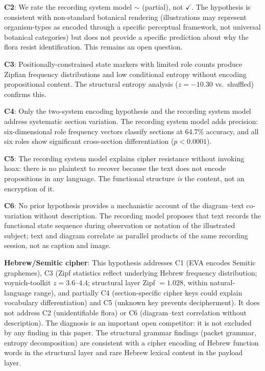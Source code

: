 \documentclass[11pt,a4paper,twocolumn]{article}
\begin{document}
\textbf{C2}: We rate the recording system model $\sim$ (partial), not $\checkmark$. The hypothesis is consistent with non-standard botanical rendering (illustrations may represent organism-types as encoded through a specific perceptual framework, not universal botanical categories) but does not provide a specific prediction about why the flora resist identification. This remains an open question.

\textbf{C3}: Positionally-constrained state markers with limited role counts produce Zipfian frequency distributions and low conditional entropy without encoding propositional content. The structural entropy analysis ($z = -10.30$ vs.\ shuffled) confirms this.

\textbf{C4}: Only the two-system encoding hypothesis and the recording system model address systematic section variation. The recording system model adds precision: six-dimensional role frequency vectors classify sections at 64.7\% accuracy, and all six roles show significant cross-section differentiation ($p < 0.0001$).

\textbf{C5}: The recording system model explains cipher resistance without invoking hoax: there is no plaintext to recover because the text does not encode propositions in any language. The functional structure \textit{is} the content, not an encryption of it.

\textbf{C6}: No prior hypothesis provides a mechanistic account of the diagram--text co-variation without description. The recording model proposes that text records the functional state sequence during observation or notation of the illustrated subject; text and diagram correlate as parallel products of the same recording session, not as caption and image.

\textbf{Hebrew/Semitic cipher}: This hypothesis addresses C1 (EVA encodes Semitic graphemes), C3 (Zipf statistics reflect underlying Hebrew frequency distribution; voynich-toolkit $z = 3.6$--$4.4$; structural layer Zipf $= 1.028$, within natural-language range), and partially C4 (section-specific cipher keys could explain vocabulary differentiation) and C5 (unknown key prevents decipherment). It does not address C2 (unidentifiable flora) or C6 (diagram--text correlation without description). The diagnosis is an important open competitor: it is not excluded by any finding in this paper. The structural grammar findings (packet grammar, entropy decomposition) are consistent with a cipher encoding of Hebrew function words in the structural layer and rare Hebrew lexical content in the payload layer.
\end{document}

